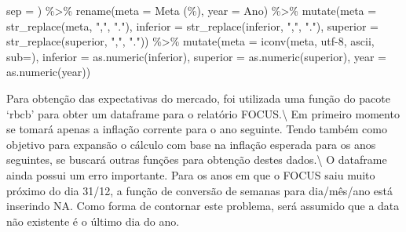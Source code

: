 \documentclass[
]{article}
\newenvironment{Shaded}{\begin{snugshade}}{\end{snugshade}}
\newcommand{\AttributeTok}[1]{\textcolor[rgb]{0.77,0.63,0.00}{#1}}
\newcommand{\FunctionTok}[1]{\textcolor[rgb]{0.00,0.00,0.00}{#1}}
\newcommand{\NormalTok}[1]{#1}
\newcommand{\SpecialCharTok}[1]{\textcolor[rgb]{0.00,0.00,0.00}{#1}}
\newcommand{\StringTok}[1]{\textcolor[rgb]{0.31,0.60,0.02}{#1}}
\begin{document}
\begin{Shaded}
\begin{Highlighting}[]
    \AttributeTok{sep =} \StringTok{\textquotesingle{}{-}\textquotesingle{}} 
\NormalTok{  ) }\SpecialCharTok{\%\textgreater{}\%} 
  \FunctionTok{rename}\NormalTok{(}\AttributeTok{meta =} \StringTok{\textasciigrave{}}\AttributeTok{Meta (\%)}\StringTok{\textasciigrave{}}\NormalTok{,}
         \AttributeTok{year =}\NormalTok{ Ano) }\SpecialCharTok{\%\textgreater{}\%} 
  \FunctionTok{mutate}\NormalTok{(}\AttributeTok{meta =} \FunctionTok{str\_replace}\NormalTok{(meta, }\StringTok{","}\NormalTok{, }\StringTok{"."}\NormalTok{),}
         \AttributeTok{inferior =} \FunctionTok{str\_replace}\NormalTok{(inferior, }\StringTok{","}\NormalTok{, }\StringTok{"."}\NormalTok{),}
         \AttributeTok{superior =} \FunctionTok{str\_replace}\NormalTok{(superior, }\StringTok{","}\NormalTok{, }\StringTok{"."}\NormalTok{)) }\SpecialCharTok{\%\textgreater{}\%} 
  \FunctionTok{mutate}\NormalTok{(}\AttributeTok{meta =} \FunctionTok{iconv}\NormalTok{(meta, }\StringTok{\textquotesingle{}utf{-}8\textquotesingle{}}\NormalTok{, }\StringTok{\textquotesingle{}ascii\textquotesingle{}}\NormalTok{, }\AttributeTok{sub=}\StringTok{\textquotesingle{}\textquotesingle{}}\NormalTok{),}
         \AttributeTok{inferior =} \FunctionTok{as.numeric}\NormalTok{(inferior),}
         \AttributeTok{superior =} \FunctionTok{as.numeric}\NormalTok{(superior),}
         \AttributeTok{year =} \FunctionTok{as.numeric}\NormalTok{(year))}
\end{Highlighting}
\end{Shaded}

Para obtenção das expectativas do mercado, foi utilizada uma função do
pacote `rbcb' para obter um dataframe para o relatório
FOCUS.\textbackslash{} Em primeiro momento se tomará apenas a inflação
corrente para o ano seguinte. Tendo também como objetivo para expansão o
cálculo com base na inflação esperada para os anos seguintes, se buscará
outras funções para obtenção destes dados.\textbackslash{} O dataframe
ainda possui um erro importante. Para os anos em que o FOCUS saiu muito
próximo do dia 31/12, a função de conversão de semanas para dia/mês/ano
está inserindo NA. Como forma de contornar este problema, será assumido
que a data não existente é o último dia do ano.
\end{document}

